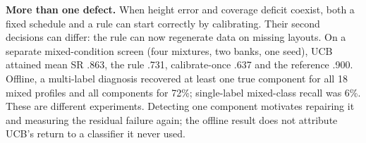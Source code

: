 \textbf{More than one defect.} When height error and coverage deficit coexist, both a fixed schedule and a rule can start correctly by calibrating. Their second decisions can differ: the rule can now regenerate data on missing layouts. On a separate mixed-condition screen (four mixtures, two banks, one seed), UCB attained mean SR .863, the rule .731, calibrate-once .637 and the reference .900. Offline, a multi-label diagnosis recovered at least one true component for all 18 mixed profiles and all components for 72\%; single-label mixed-class recall was 6\%. These are different experiments. Detecting one component motivates repairing it and measuring the residual failure again; the offline result does not attribute UCB's return to a classifier it never used.
